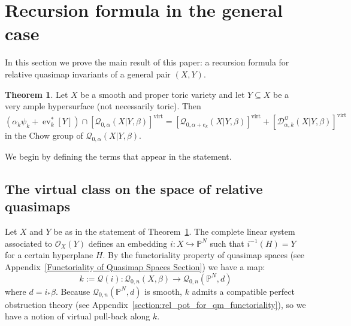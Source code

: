 \documentclass[11pt]{amsart}
\newcommand{\Q}[4]{\mathcal{Q}_{#1,#2}(#3,#4)}
\newcommand{\PP}{\mathbb P}
\newcommand{\OO}{\mathcal{O}}
\renewcommand{\to}{\rightarrow}
\newcommand{\virt}[1]{[#1]^{\operatorname{virt}}}
\newcommand{\ev}{\operatorname{ev}}
\newcommand{\om}[1]{\mathcal{#1}}
\theoremstyle{definition}
\newtheorem{thm}{Theorem}[section]
\theoremstyle{definition}
\begin{document}
\section{Recursion formula in the general case}\label{Section recursion formula in general case}

In this section we prove the main result of this paper: a recursion formula for relative quasimap invariants of a general pair $(X,Y)$.  

\begin{thm} \label{Theorem general recursion} Let $X$ be a smooth and proper toric variety and let $Y \subseteq X$ be a very ample hypersurface (not necessarily toric). Then
\begin{equation*} (\alpha_k \psi_k + \ev_k^* [Y]) \cap \virt{\Q{0}{\alpha}{X|Y}{\beta}} = \virt{\Q{0}{\alpha+e_k}{X|Y}{\beta}} + \virt{\mathcal D^\mathcal{Q}_{\alpha,k}(X|Y,\beta)} \end{equation*}
in the Chow group of $\Q{0}{\alpha}{X|Y}{\beta}$. 
\end{thm}

\noindent We begin by defining the terms that appear in the statement.

\subsection{The virtual class on the space of relative quasimaps} Let $X$ and $Y$ be as in the statement of Theorem~\ref{Theorem general recursion}.  The complete linear system associated to $\OO_X(Y)$ defines an embedding $i : X \hookrightarrow \PP^N$ such that $i^{-1}(H) = Y$ for a certain hyperplane $H$. By the functoriality property of quasimap spaces (see Appendix~\ref{Functoriality of Quasimap Spaces Section}) we have a map:
\begin{equation*} k := \om{Q}(i) : \Q{0}{n}{X}{\beta} \to \Q{0}{n}{\PP^N}{d} \end{equation*}
where $d=i_*\beta$. Because $\Q{0}{n}{\PP^N}{d}$ is smooth, $k$ admits a compatible perfect obstruction theory (see Appendix~\ref{section:rel_pot_for_qm_functoriality}), so we have a notion of virtual pull-back along $k$.
\end{document}
